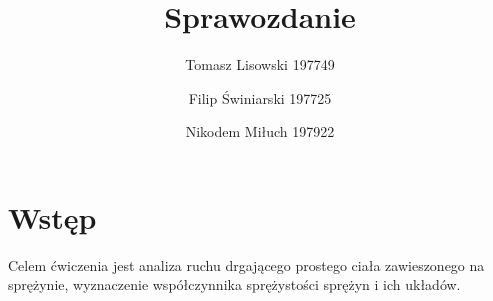 \documentclass{article} %
\title{Sprawozdanie}
\author{Tomasz Lisowski 197749\and Filip Świniarski 197725\and Nikodem Miłuch 197922}
\begin{document}
\maketitle
\section{Wstęp}
 
Celem ćwiczenia jest analiza ruchu drgającego prostego ciała zawieszonego na
sprężynie, wyznaczenie współczynnika sprężystości sprężyn i ich układów.
\end{document}
